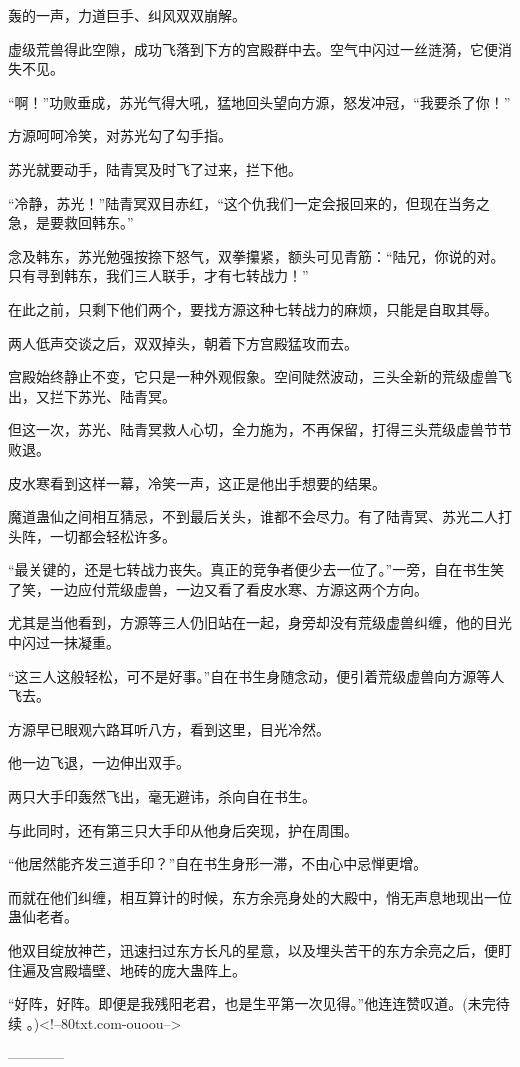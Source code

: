 \begin{this_body}
轰的一声，力道巨手、纠风双双崩解。

虚级荒兽得此空隙，成功飞落到下方的宫殿群中去。空气中闪过一丝涟漪，它便消失不见。

“啊！”功败垂成，苏光气得大吼，猛地回头望向方源，怒发冲冠，“我要杀了你！”

方源呵呵冷笑，对苏光勾了勾手指。

苏光就要动手，陆青冥及时飞了过来，拦下他。

“冷静，苏光！”陆青冥双目赤红，“这个仇我们一定会报回来的，但现在当务之急，是要救回韩东。”

念及韩东，苏光勉强按捺下怒气，双拳攥紧，额头可见青筋：“陆兄，你说的对。只有寻到韩东，我们三人联手，才有七转战力！”

在此之前，只剩下他们两个，要找方源这种七转战力的麻烦，只能是自取其辱。

两人低声交谈之后，双双掉头，朝着下方宫殿猛攻而去。

宫殿始终静止不变，它只是一种外观假象。空间陡然波动，三头全新的荒级虚兽飞出，又拦下苏光、陆青冥。

但这一次，苏光、陆青冥救人心切，全力施为，不再保留，打得三头荒级虚兽节节败退。

皮水寒看到这样一幕，冷笑一声，这正是他出手想要的结果。

魔道蛊仙之间相互猜忌，不到最后关头，谁都不会尽力。有了陆青冥、苏光二人打头阵，一切都会轻松许多。

“最关键的，还是七转战力丧失。真正的竞争者便少去一位了。”一旁，自在书生笑了笑，一边应付荒级虚兽，一边又看了看皮水寒、方源这两个方向。

尤其是当他看到，方源等三人仍旧站在一起，身旁却没有荒级虚兽纠缠，他的目光中闪过一抹凝重。

“这三人这般轻松，可不是好事。”自在书生身随念动，便引着荒级虚兽向方源等人飞去。

方源早已眼观六路耳听八方，看到这里，目光冷然。

他一边飞退，一边伸出双手。

两只大手印轰然飞出，毫无避讳，杀向自在书生。

与此同时，还有第三只大手印从他身后突现，护在周围。

“他居然能齐发三道手印？”自在书生身形一滞，不由心中忌惮更增。

而就在他们纠缠，相互算计的时候，东方余亮身处的大殿中，悄无声息地现出一位蛊仙老者。

他双目绽放神芒，迅速扫过东方长凡的星意，以及埋头苦干的东方余亮之后，便盯住遍及宫殿墙壁、地砖的庞大蛊阵上。

“好阵，好阵。即便是我残阳老君，也是生平第一次见得。”他连连赞叹道。(未完待续 。)<!--80txt.com-ouoou-->

------------

\end{this_body}

